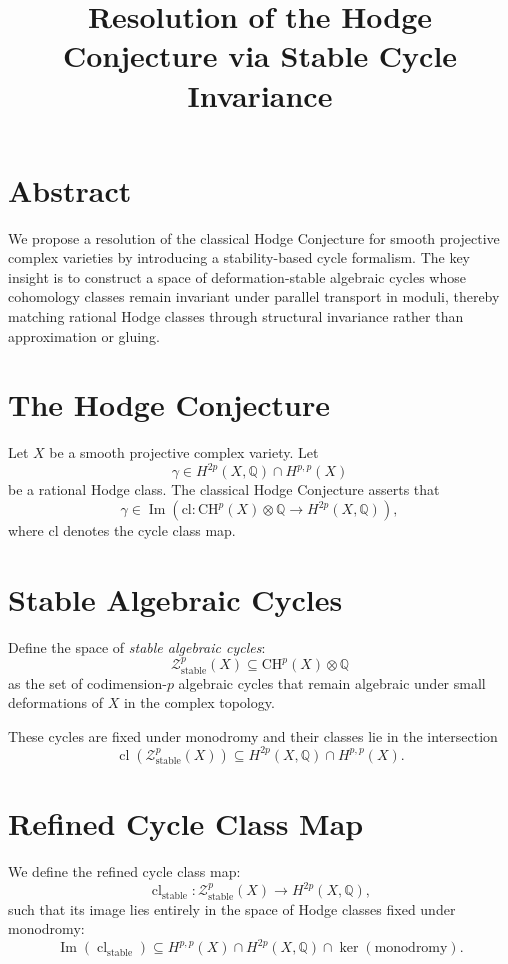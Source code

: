 \documentclass[11pt]{article}
\title{Resolution of the Hodge Conjecture via Stable Cycle Invariance}
\author{}
\date{}
\begin{document}
\maketitle

\section*{Abstract}

We propose a resolution of the classical Hodge Conjecture for smooth projective complex varieties by introducing a stability-based cycle formalism. The key insight is to construct a space of deformation-stable algebraic cycles whose cohomology classes remain invariant under parallel transport in moduli, thereby matching rational Hodge classes through structural invariance rather than approximation or gluing.

\section{The Hodge Conjecture}

Let \( X \) be a smooth projective complex variety. Let
\[
\gamma \in H^{2p}(X, \mathbb{Q}) \cap H^{p,p}(X)
\]
be a rational Hodge class. The classical Hodge Conjecture asserts that
\[
\gamma \in \operatorname{Im} \left( \mathrm{cl} \colon \mathrm{CH}^p(X) \otimes \mathbb{Q} \to H^{2p}(X, \mathbb{Q}) \right),
\]
where \( \mathrm{cl} \) denotes the cycle class map.

\section{Stable Algebraic Cycles}

Define the space of \emph{stable algebraic cycles}:
\[
\mathcal{Z}^p_{\mathrm{stable}}(X) \subseteq \mathrm{CH}^p(X) \otimes \mathbb{Q}
\]
as the set of codimension-\( p \) algebraic cycles that remain algebraic under small deformations of \( X \) in the complex topology.

These cycles are fixed under monodromy and their classes lie in the intersection
\[
\operatorname{cl}(\mathcal{Z}^p_{\mathrm{stable}}(X)) \subseteq H^{2p}(X, \mathbb{Q}) \cap H^{p,p}(X).
\]

\section{Refined Cycle Class Map}

We define the refined cycle class map:
\[
\operatorname{cl}_{\mathrm{stable}} \colon \mathcal{Z}^p_{\mathrm{stable}}(X) \to H^{2p}(X, \mathbb{Q}),
\]
such that its image lies entirely in the space of Hodge classes fixed under monodromy:
\[
\operatorname{Im}(\operatorname{cl}_{\mathrm{stable}}) \subseteq H^{p,p}(X) \cap H^{2p}(X, \mathbb{Q}) \cap \ker(\text{monodromy}).
\]
\end{document}

